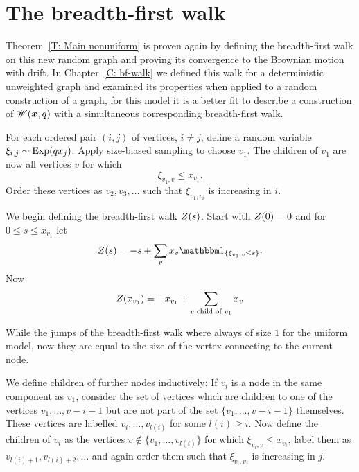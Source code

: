 \section{The breadth-first walk}

Theorem~\ref{T: Main nonuniform} is proven again by defining the breadth-first walk on this new random graph
and proving its convergence to the Brownian motion with drift.
In Chapter~\ref{C: bf-walk} we defined this walk for a deterministic unweighted graph 
and examined its properties when applied to a random construction of a graph,
for this model it is a better fit to describe a construction of $\mathscr{W}(\boldsymbol{x}, q)$ with a simultaneous corresponding breadth-first walk.

For each ordered pair $(i, j)$ of vertices, $i \neq j$, define a random variable $\xi_{i,j} \sim \operatorname*{Exp}(q x_j)$.
Apply size-biased sampling to choose $v_1$.
The children of $v_1$ are now all vertices $v$ for which
\begin{equation}
	\xi_{v_1, v} \leq x_{v_1}.
\end{equation}
Order these vertices as $v_2, v_3, \dots$ such that $\xi_{v_1, v_i}$ is increasing in $i$.

We begin defining the breadth-first walk $Z(s)$.
Start with $Z(0) = 0$ and for $0 \leq s \leq x_{v_1}$ let
\begin{equation}
	\bfw(s) = -s + \sum_{v} x_v \Ind{\{\xi_{v_1, v} \leq s\}}.
\end{equation}
Now
\begin{equation}
	Z(x_{v_1}) = -x_{v_1} + \sum_{\text{$v$ child of $v_1$}} x_v
\end{equation}


While the jumps of the breadth-first walk where always of size $1$ for the uniform model,
now they are equal to the size of the vertex connecting to the current node.

We define children of further nodes inductively:
If $v_i$ is a node in the same component as $v_1$,
consider the set of vertices which are children to one of the vertices $v_1, \dots, v-{i-1}$
but are not part of the set $\{v_1, \dots, v-{i-1}\}$ themselves.
These vertices are labelled $v_i, \dots, v_{l(i)}$ for some $l(i) \geq i$.
Now define the children of $v_i$ as the vertices 
$v \notin \{v_1, \dots, v_{l(i)}\}$ for which $\xi_{v_i, v} \leq x_{v_i}$,
label them as $v_{l(i) + 1}, v_{l(i) + 2}, \dots$ 
and again order them such that $\xi_{v_i, v_j}$ is increasing in $j$.
 
